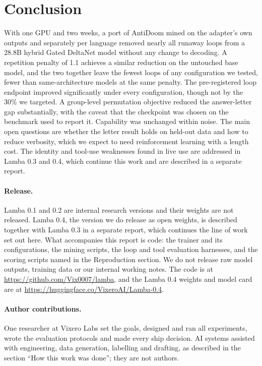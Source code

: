 \documentclass[11pt]{article}
\begin{document}
\section{Conclusion}

With one GPU and two weeks, a port of AntiDoom mined on the adapter's own outputs and separately per language removed nearly all runaway loops from a 28.8B hybrid Gated DeltaNet model without any change to decoding. A repetition penalty of 1.1 achieves a similar reduction on the untouched base model, and the two together leave the fewest loops of any configuration we tested, fewer than same-architecture models at the same penalty. The pre-registered loop endpoint improved significantly under every configuration, though not by the 30\% we targeted. A group-level permutation objective reduced the answer-letter gap substantially, with the caveat that the checkpoint was chosen on the benchmark used to report it. Capability was unchanged within noise. The main open questions are whether the letter result holds on held-out data and how to reduce verbosity, which we expect to need reinforcement learning with a length cost. The identity and tool-use weaknesses found in live use are addressed in Lamba 0.3 and 0.4, which continue this work and are described in a separate report.

\paragraph{Release.} Lamba 0.1 and 0.2 are internal research versions and their weights are not released. Lamba 0.4, the version we do release as open weights, is described together with Lamba 0.3 in a separate report, which continues the line of work set out here. What accompanies this report is code: the trainer and its configurations, the mining scripts, the loop and tool evaluation harnesses, and the scoring scripts named in the Reproduction section. We do not release raw model outputs, training data or our internal working notes. The code is at \url{https://github.com/Vix0007/lamba}, and the Lamba 0.4 weights and model card are at \url{https://huggingface.co/VixeroAI/Lamba-0.4}.

\paragraph{Author contributions.} One researcher at Vixero Labs set the goals, designed and ran all experiments, wrote the evaluation protocols and made every ship decision. AI systems assisted with engineering, data generation, labelling and drafting, as described in the section ``How this work was done''; they are not authors.
\end{document}
